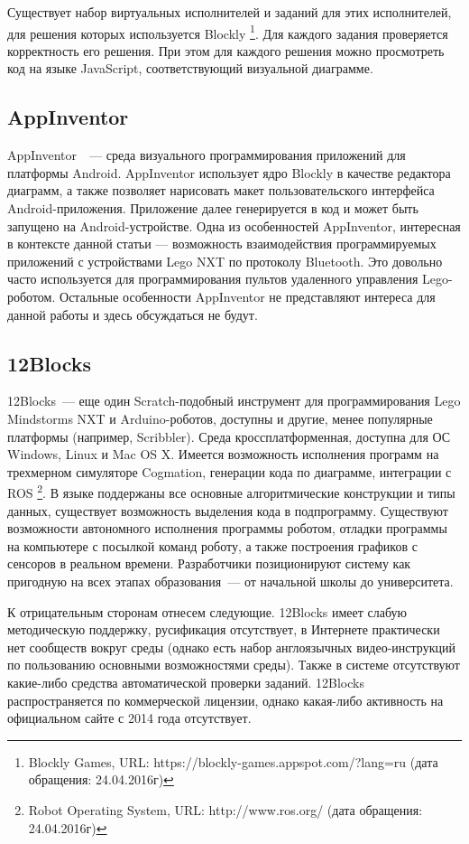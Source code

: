 \documentclass[a5paper]{article}
\begin{document}
Существует набор виртуальных исполнителей и заданий для этих исполнителей, для решения которых используется Blockly%
\footnote{Blockly Games, URL: https://blockly-games.appspot.com/?lang=ru (дата обращения: 24.04.2016г)}. 
Для каждого задания проверяется корректность его решения. При этом для каждого решения можно просмотреть код 
на языке JavaScript, соответствующий визуальной диаграмме.

\subsection{AppInventor}

AppInventor~\cite{wolber2011app}~--- среда визуального программирования приложений для платформы Android. 
AppInventor использует ядро Blockly в качестве редактора диаграмм, а также позволяет 
нарисовать макет пользовательского интерфейса 
Android-приложения. Приложение далее генерируется в код и может быть запущено на Android-устройстве. Одна 
из особенностей AppInventor, интересная в контексте данной статьи --- возможность взаимодействия программируемых 
приложений с устройствами Lego NXT по протоколу Bluetooth. Это довольно часто используется для программирования 
пультов удаленного управления Lego-роботом. Остальные особенности AppInventor не представляют интереса для данной 
работы и здесь обсуждаться не будут.

\subsection{12Blocks}

12Blocks~--- еще один Scratch-подобный инструмент для программирования Lego Mindstorms NXT и Arduino-роботов, 
доступны и другие, менее популярные платформы (например, Scribbler). Среда кроссплатформенная, доступна для 
ОС Windows, Linux и Mac OS X. Имеется возможность исполнения программ на трехмерном симуляторе Cogmation, 
генерации кода по диаграмме, интеграции с ROS%
\footnote{Robot Operating System, URL: http://www.ros.org/ (дата обращения: 24.04.2016г)}. 
В языке поддержаны все основные алгоритмические конструкции и 
типы данных, существует возможность выделения кода в подпрограмму. Существуют возможности автономного исполнения 
программы роботом, отладки программы на компьютере с посылкой команд роботу, а также построения графиков с 
сенсоров в реальном времени. Разработчики позиционируют систему как пригодную на всех этапах образования~--- от 
начальной школы до университета.

К отрицательным сторонам отнесем следующие.  12Blocks имеет слабую методическую поддержку, русификация 
отсутствует, в Интернете практически нет сообществ вокруг среды (однако есть набор англоязычных видео-инструкций по пользованию 
основными возможностями среды). Также в системе отсутствуют какие-либо средства автоматической проверки заданий. 
12Blocks распространяется по коммерческой лицензии, однако какая-либо активность на официальном сайте 
с 2014 года отсутствует.
\end{document}
